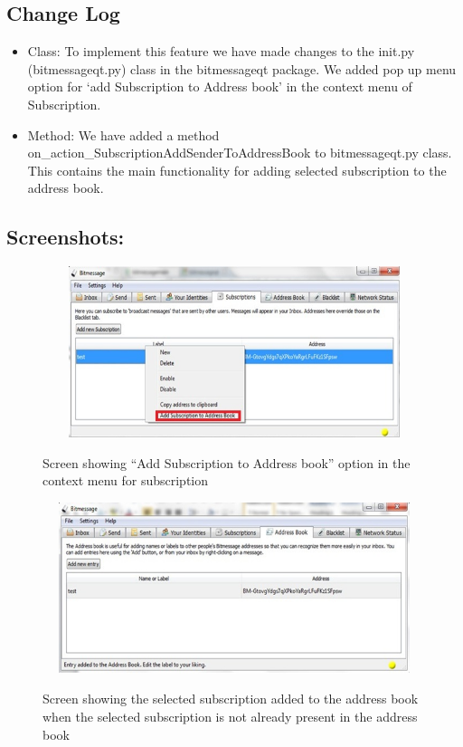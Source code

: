 \documentclass[12pt]{article}
\begin{document}
\subsection{Change Log}

\begin{itemize}
\item Class: To implement this feature we have made changes to the init.py (bitmessageqt.py) class in the bitmessageqt package. We added pop up menu option for `add Subscription to Address book' in the context menu of Subscription.
\item Method: We have added a method on\_action\_SubscriptionAddSenderToAddressBook to bitmessageqt.py class. This contains the main functionality for adding selected subscription to the address book.
\end{itemize}

\subsection{Screenshots:}

\begin{figure}[H]
\begin{center}
    {\label{fig:1} \includegraphics[width=12cm,height=5cm]{F1_1.jpg}}   
  \centering  \caption{ Screen showing “Add Subscription to Address book” option in the context menu for subscription}
  \end{center}
\end{figure}

\begin{figure}[H]
\begin{center}
    {\label{fig:1} \includegraphics[width=12cm,height=5cm]{F1_2.jpg}}   
  \centering  \caption{Screen showing the selected subscription added to the address book when the selected subscription is not already present in the address book}
  \end{center}
\end{figure}
\end{document}
